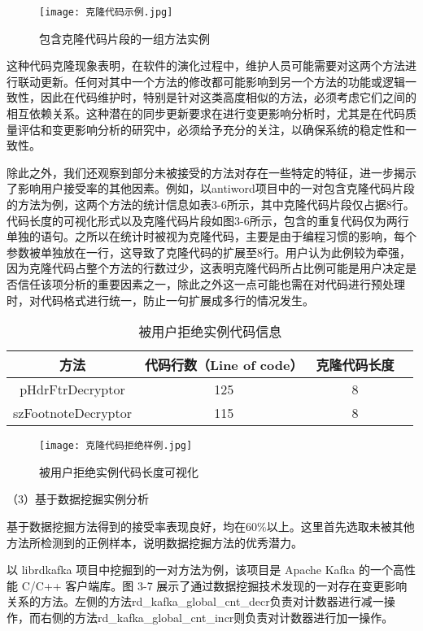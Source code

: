 \begin{figure}[h]
\centering
\texttt{[image: 克隆代码示例.jpg]}
\caption{包含克隆代码片段的一组方法实例}
\end{figure}

这种代码克隆现象表明，在软件的演化过程中，维护人员可能需要对这两个方法进行联动更新。任何对其中一个方法的修改都可能影响到另一个方法的功能或逻辑一致性，因此在代码维护时，特别是针对这类高度相似的方法，必须考虑它们之间的相互依赖关系。这种潜在的同步更新要求在进行变更影响分析时，尤其是在代码质量评估和变更影响分析的研究中，必须给予充分的关注，以确保系统的稳定性和一致性。

除此之外，我们还观察到部分未被接受的方法对存在一些特定的特征，进一步揭示了影响用户接受率的其他因素。例如，以antiword项目中的一对包含克隆代码片段的方法为例，这两个方法的统计信息如表3-6所示，其中克隆代码片段仅占据8行。代码长度的可视化形式以及克隆代码片段如图3-6所示，包含的重复代码仅为两行单独的语句。之所以在统计时被视为克隆代码，主要是由于编程习惯的影响，每个参数被单独放在一行，这导致了克隆代码的扩展至8行。用户认为此例较为牵强，因为克隆代码占整个方法的行数过少，这表明克隆代码所占比例可能是用户决定是否信任该项分析的重要因素之一，除此之外这一点可能也需在对代码进行预处理时，对代码格式进行统一，防止一句扩展成多行的情况发生。

\begin{table}[htbp]
\caption{被用户拒绝实例代码信息}
\vspace{0.5em}\centering\wuhao
\begin{tabular}{cccc}
\toprule
方法 & 代码行数（Line of code）  & 克隆代码长度\\
\midrule
pHdrFtrDecryptor & 125 & 8 \\
szFootnoteDecryptor  & 115 & 8 \\
\bottomrule
\end{tabular}
\end{table}

\begin{figure}[h]
\centering
\texttt{[image: 克隆代码拒绝样例.jpg]}
\caption{被用户拒绝实例代码长度可视化}
\end{figure}

（3）基于数据挖掘实例分析

基于数据挖掘方法得到的接受率表现良好，均在60\%以上。这里首先选取未被其他方法所检测到的正例样本，说明数据挖掘方法的优秀潜力。

以 librdkafka 项目中挖掘到的一对方法为例，该项目是 Apache Kafka 的一个高性能 C/C++ 客户端库。图 3-7 展示了通过数据挖掘技术发现的一对存在变更影响关系的方法。左侧的方法rd\_kafka\_global\_cnt\_decr负责对计数器进行减一操作，而右侧的方法rd\_kafka\_global\_cnt\_incr则负责对计数器进行加一操作。

